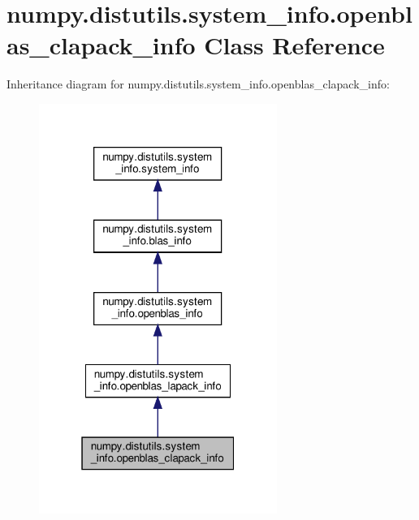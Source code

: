 \hypertarget{classnumpy_1_1distutils_1_1system__info_1_1openblas__clapack__info}{}\section{numpy.\+distutils.\+system\+\_\+info.\+openblas\+\_\+clapack\+\_\+info Class Reference}
\label{classnumpy_1_1distutils_1_1system__info_1_1openblas__clapack__info}


Inheritance diagram for numpy.\+distutils.\+system\+\_\+info.\+openblas\+\_\+clapack\+\_\+info\+:
\nopagebreak
\begin{figure}[H]
\begin{center}
\leavevmode
\includegraphics[width=220pt]{classnumpy_1_1distutils_1_1system__info_1_1openblas__clapack__info__inherit__graph}
\end{center}
\end{figure}


